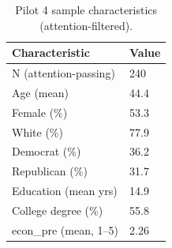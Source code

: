 \begin{table}[!h]
\centering
\caption{\label{tab:p4demo}Pilot 4 sample characteristics (attention-filtered).}
\centering
\fontsize{10}{12}\selectfont
\begin{tabular}[t]{ll}
\toprule
Characteristic & Value\\
\midrule
N (attention-passing) & 240\\
Age (mean) & 44.4\\
Female (\%) & 53.3\\
White (\%) & 77.9\\
Democrat (\%) & 36.2\\
\addlinespace
Republican (\%) & 31.7\\
Education (mean yrs) & 14.9\\
College degree (\%) & 55.8\\
econ\_pre (mean, 1--5) & 2.26\\
\bottomrule
\end{tabular}
\end{table}
